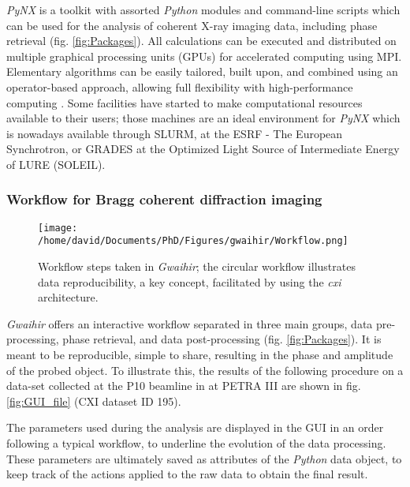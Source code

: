 \textit{PyNX} \parencite{pynx2011} is a toolkit with assorted \textit{Python} modules and command-line scripts which can be used for the analysis of coherent X-ray imaging data, including phase retrieval (fig. \ref{fig:Packages}).
All calculations can be executed and distributed on multiple graphical processing units (GPUs) for accelerated computing using MPI.
Elementary algorithms can be easily tailored, built upon, and combined using an operator-based approach, allowing full flexibility with high-performance computing \parencite{pynx2020operators}.
Some facilities have started to make computational resources available to their users; those machines are an ideal environment for \textit{PyNX} which is nowadays available through SLURM, at the ESRF - The European Synchrotron, or GRADES at the Optimized Light Source of Intermediate Energy of LURE (SOLEIL).

\subsubsection{Workflow for Bragg coherent diffraction imaging} \label{sec:Workflow}

\begin{figure}[!htb]
    \centering
    \texttt{[image: /home/david/Documents/PhD/Figures/gwaihir/Workflow.png]}
    \caption{Workflow steps taken in \textit{Gwaihir}; the circular workflow illustrates data reproducibility, a key concept, facilitated by using the \textit{cxi} architecture.}
    \label{fig:Workflow}
\end{figure}

\textit{Gwaihir} offers an interactive workflow separated in three main groups, data pre-processing, phase retrieval, and data post-processing (fig. \ref{fig:Packages}). It is meant to be reproducible, simple to share, resulting in the phase and amplitude of the probed object. To illustrate this, the results of the following procedure on a data-set collected at the P10 beamline in at PETRA III are shown in fig. \ref{fig:GUI_file} (CXI dataset ID 195).

The parameters used during the analysis are displayed in the GUI in an order following a typical workflow, to underline the evolution of the data processing.
These parameters are ultimately saved as attributes of the \textit{Python} data object, to keep track of the actions applied to the raw data to obtain the final result.

